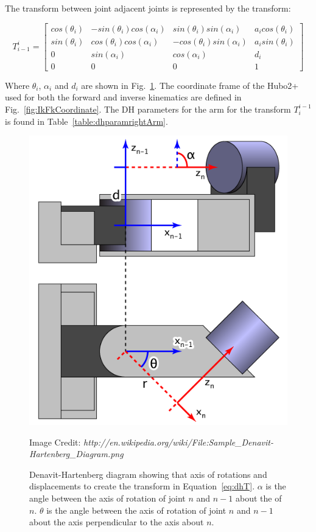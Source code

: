 The transform between joint adjacent joints is represented by the transform:

\begin{equation}\label{eq:dhT}
T_{i-1}^{i} = \left[ \begin{array}{cccc} 
cos(\theta_i) & -sin(\theta_i)cos(\alpha_i) &  sin(\theta_i)sin(\alpha_i)  &  a_i cos(\theta_i) \\ 
sin(\theta_i) &  cos(\theta_i)cos(\alpha_i) & -cos(\theta_i)sin(\alpha_i)  &  a_i sin(\theta_i) \\
0             &  sin(\alpha_i)              &  cos(\alpha_i)               &  d_i               \\
0             &  0                          &  0                           &  1                 
\end{array} \right]
\end{equation}

Where $\theta_i$, $\alpha_i$ and $d_i$ are shown in Fig.~\ref{fig:dhDiagram}.  The coordinate frame of the Hubo2+ used for both the forward and inverse kinematics are defined in Fig.~\ref{fig:IkFkCoordinate}.  The DH parameters for the arm for the transform $T_i^{i-1}$ is found in Table~\ref{table:dhparamrightArm}.

\begin{figure}[thpb]
  \centering
\includegraphics[width=0.5\columnwidth]{./examples/pix/Sample_Denavit-Hartenberg_Diagram.png}
\caption{Denavit-Hartenberg diagram showing that axis of rotations and displacements to create the transform in Equation~\ref{eq:dhT}.  $\alpha$ is the angle between the axis of rotation of joint $n$ and $n-1$ about the of $n$. $\theta$ is the angle between the axis of rotation of joint $n$ and $n-1$ about the axis perpendicular to the axis about $n$.}
Image Credit: \textit{http://en.wikipedia.org/wiki/File:Sample\_Denavit-Hartenberg\_Diagram.png}
\label{fig:dhDiagram}
\end{figure}


